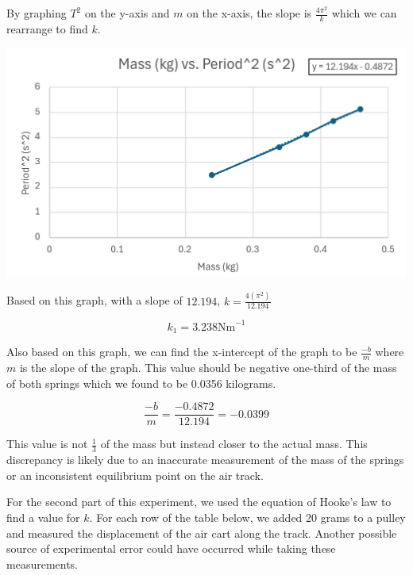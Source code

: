\documentclass[12pt]{article}
\begin{document}
By graphing $T^{2}$ on the y-axis and $m$ on the x-axis, the slope is $\frac{4\pi^{2}}{k}$ which we can 
rearrange to find $k$.

\vspace{1em}
\begin{center}
    \includegraphics[scale=0.5]{graph_12_1.png}
\end{center}
\vspace{1em}

Based on this graph, with a slope of $12.194$, $k = \frac{4(\pi^2)}{12.194}$

\[ k_1 = 3.238 \text{Nm}^{-1} \]

Also based on this graph, we can find the x-intercept of the graph to be $\frac{-b}{m}$
where $m$ is the slope of the graph. This value should be negative one-third of the
mass of both springs which we found to be 0.0356 kilograms.

\[ \frac{-b}{m} = \frac{-0.4872}{12.194} = -0.0399 \]

This value is not $\frac{1}{3}$ of the mass but instead closer to the actual mass.
This discrepancy is likely due to an inaccurate measurement of the mass of the springs
or an inconsistent equilibrium point on the air track.

\newpage

For the second part of this experiment, we used the equation of Hooke's law to find a value for $k$.
For each row of the table below, we added 20 grams to a pulley and measured the displacement of the air cart
along the track. Another possible source of experimental error could have occurred while taking these measurements.
\end{document}

